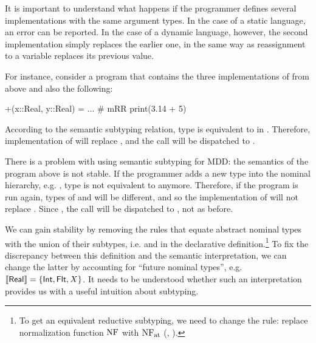 It is important to understand what happens if the programmer defines
several implementations with the same argument types. 
In the case of a static language, an error can be reported.
In the case of a dynamic language, however, the second implementation
simply replaces the earlier one, in the same way as reassignment
to a variable replaces its previous value.

For instance, consider a program 
that contains the three implementations of \jlcode{(+)} from above
and also the following:
\begin{lstminijl}
+(x::Real, y::Real) = ...   # mRR
print(3.14 + 5)	 
\end{lstminijl}
According to the semantic subtyping relation, type  is equivalent
to  in \BetaJulia. 
Therefore, implementation of  will replace , 
and the call  will be dispatched to .

There is a problem with using semantic subtyping for MDD:
the semantics of the program above is not stable.
If the programmer adds a new type into the nominal hierarchy,
e.g. , type  is not
equivalent to  anymore.
Therefore, if the program is run again, types of  and 
will be different, and so the implementation of  
will not replace . 
Since , the call  
will be dispatched to , not  as before.

We can gain stability by removing the rules that 
equate abstract nominal types with the union of their subtypes,
i.e.  and  in the declarative definition.\footnote{
    To get an equivalent reductive subtyping, we need to change 
    the  rule: replace normalization function $\mathop{\mathrm{NF}}$ with $\mathop{\mathrm{NF}_{\mathrm{at}}}$ 
    (, ).}
To fix the discrepancy between this definition and the semantic interpretation,
we can change the latter by accounting for ``future nominal types'',
e.g. $\llbracket \mathsf{Real} \rrbracket = \{\mathsf{Int}, \mathsf{Flt}, X\}$.
It needs to be understood whether such an interpretation provides us with
a useful intuition about subtyping.


